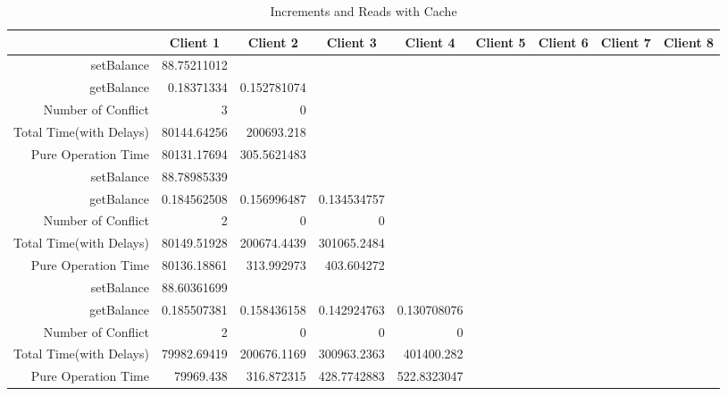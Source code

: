 \begin{landscape}
\begin{table}[htbp]
\scriptsize
  \centering
  \caption{Increments and Reads with Cache}
    \begin{tabular}{rrrrrrrrr}
    \toprule
          & \multicolumn{1}{c}{Client 1} & \multicolumn{1}{c}{Client 2} & \multicolumn{1}{c}{Client 3} & \multicolumn{1}{c}{Client 4} & \multicolumn{1}{c}{Client 5} & \multicolumn{1}{c}{Client 6} & \multicolumn{1}{c}{Client 7} & \multicolumn{1}{c}{Client 8} \\
    \midrule
    setBalance & 88.75211012 &       &       &       &       &       &       &  \\
    getBalance & 0.18371334 & 0.152781074 &       &       &       &       &       &  \\
    Number of Conflict & 3     & 0     &       &       &       &       &       &  \\
    Total Time(with Delays) & 80144.64256 & 200693.218 &       &       &       &       &       &  \\
    Pure Operation Time & 80131.17694 & 305.5621483 &       &       &       &       &       &  \\
\cline{1-9}    
    setBalance & 88.78985339 &       &       &       &       &       &       &  \\
    getBalance & 0.184562508 & 0.156996487 & 0.134534757 &       &       &       &       &  \\
    Number of Conflict & 2     & 0     & 0     &       &       &       &       &  \\
    Total Time(with Delays) & 80149.51928 & 200674.4439 & 301065.2484 &       &       &       &       &  \\
    Pure Operation Time & 80136.18861 & 313.992973 & 403.604272 &       &       &       &       &  \\
\cline{1-9}    
    setBalance & 88.60361699 &       &       &       &       &       &       &  \\
    getBalance & 0.185507381 & 0.158436158 & 0.142924763 & 0.130708076 &       &       &       &  \\
    Number of Conflict & 2     & 0     & 0     & 0     &       &       &       &  \\
    Total Time(with Delays) & 79982.69419 & 200676.1169 & 300963.2363 & 401400.282 &       &       &       &  \\
    Pure Operation Time & 79969.438 & 316.872315 & 428.7742883 & 522.8323047 &       &       &       &  \\ 

\end{tabular}
\end{table}
\end{landscape}
